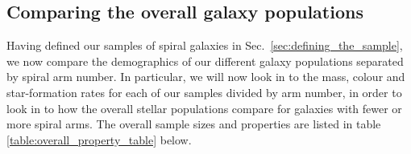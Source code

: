 \documentclass[useAMS,usenatbib]{mn2e}
\begin{document}
\subsection{Comparing the overall galaxy populations}

Having defined our samples of spiral galaxies in Sec.~\ref{sec:defining_the_sample}, we now compare the demographics of our different galaxy populations separated by spiral arm number. In particular, we will now look in to the mass, colour and star-formation rates for each of our samples divided by arm number, in order to look in to how the overall stellar populations compare for galaxies with fewer or more spiral arms. The overall sample sizes and properties are listed in table \ref{table:overall_property_table} below.
\end{document}
